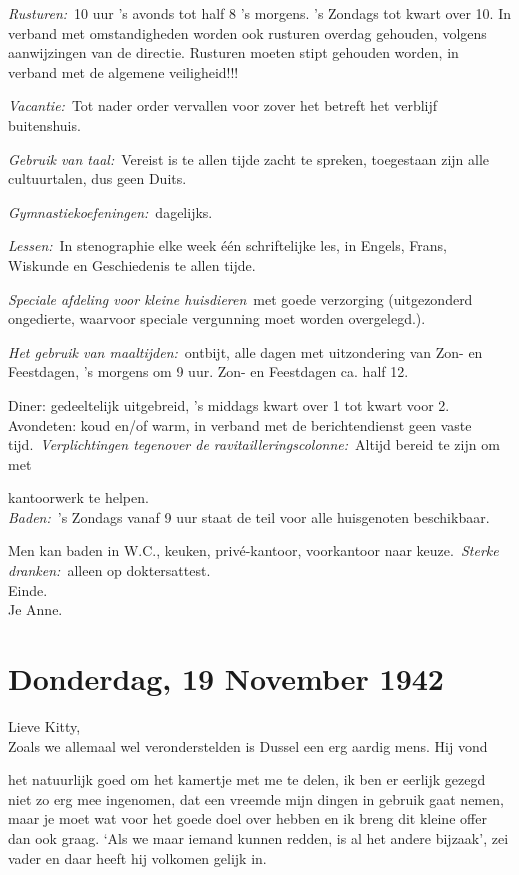 \documentclass{book}
\begin{document}
\emph{Rusturen:}~10 uur 's avonds tot half 8 's morgens. 's Zondags tot
kwart over 10. In verband met omstandigheden worden ook rusturen overdag
gehouden, volgens aanwijzingen van de directie. Rusturen moeten stipt
gehouden worden, in verband met de algemene veiligheid!!!

\emph{Vacantie:}~Tot nader order vervallen voor zover het betreft het
verblijf buitenshuis.

\emph{Gebruik van taal:}~Vereist is te allen tijde zacht te spreken,
toegestaan zijn alle cultuurtalen, dus geen Duits.

\emph{Gymnastiekoefeningen:}~dagelijks.

\emph{Lessen:}~In stenographie elke week één schriftelijke les, in
Engels, Frans, Wiskunde en Geschiedenis te allen tijde.

\emph{Speciale afdeling voor kleine huisdieren}~met goede verzorging
(uitgezonderd ongedierte, waarvoor speciale vergunning moet worden
overgelegd.).

\emph{Het gebruik van maaltijden:}~ontbijt, alle dagen met uitzondering
van Zon- en Feestdagen, 's morgens om 9 uur. Zon- en Feestdagen ca. half
12.

Diner: gedeeltelijk uitgebreid, 's middags kwart over 1 tot kwart voor
2. Avondeten: koud en/of warm, in verband met de berichtendienst geen
vaste tijd.~\emph{Verplichtingen tegenover de
ravitailleringscolonne:}~Altijd bereid te zijn om met

kantoorwerk te helpen.\\\emph{Baden:}~'s Zondags vanaf 9 uur staat de
teil voor alle huisgenoten beschikbaar.

Men kan baden in W.C., keuken, privé-kantoor, voorkantoor naar
keuze.~\emph{Sterke dranken:}~alleen op doktersattest.\\Einde.\\Je Anne.

\chapter{Donderdag, 19 November 1942}

Lieve Kitty,\\Zoals we allemaal wel veronderstelden is Dussel een erg
aardig mens. Hij vond

het natuurlijk goed om het kamertje met me te delen, ik ben er eerlijk
gezegd niet zo erg mee ingenomen, dat een vreemde mijn dingen in gebruik
gaat nemen, maar je moet wat voor het goede doel over hebben en ik breng
dit kleine offer dan ook graag. `Als we maar iemand kunnen redden, is al
het andere bijzaak', zei vader en daar heeft hij volkomen gelijk in.
\end{document}
